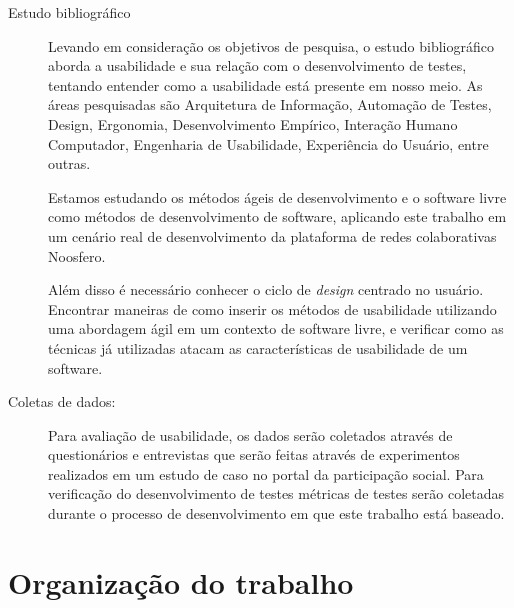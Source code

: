 \begin{description}
\item[Estudo bibliográfico]

Levando em consideração os objetivos de pesquisa, o estudo bibliográfico  aborda a usabilidade e sua relação com o desenvolvimento de testes, tentando entender como a usabilidade está presente em nosso meio. As áreas pesquisadas são Arquitetura de Informação, Automação de Testes, Design, Ergonomia, Desenvolvimento Empírico, Interação Humano Computador, Engenharia de Usabilidade, Experiência do Usuário, entre outras.

%
Estamos estudando os métodos ágeis de desenvolvimento e o software livre como métodos de desenvolvimento de software, aplicando este trabalho em um cenário real de desenvolvimento da plataforma de redes colaborativas Noosfero.%

%
Além disso é necessário conhecer o ciclo de \emph{design} centrado no usuário. Encontrar maneiras de como inserir os métodos de usabilidade utilizando uma abordagem ágil em um contexto de software livre, e verificar como as técnicas já utilizadas atacam as características de usabilidade de um software.
%

\item[Coletas de dados:]
%

Para avaliação de usabilidade, os dados serão coletados através de questionários e entrevistas que serão feitas através de experimentos realizados em um estudo de caso no portal da participação social.
Para verificação do desenvolvimento de testes métricas de testes serão coletadas durante o processo de desenvolvimento em que este trabalho está baseado.

\end{description}

\section{Organização do trabalho}

